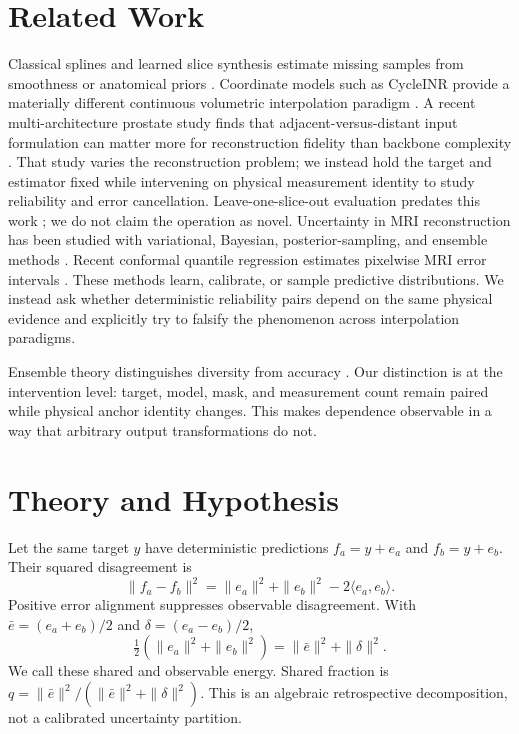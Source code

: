 \documentclass[journal,10pt]{IEEEtran}
\begin{document}
\section{Related Work}
Classical splines and learned slice synthesis estimate missing samples from smoothness or anatomical priors \cite{deboor1978splines,peng2020saint,song2024i3net}. Coordinate models such as CycleINR provide a materially different continuous volumetric interpolation paradigm \cite{fang2024cycleinr}. A recent multi-architecture prostate study finds that adjacent-versus-distant input formulation can matter more for reconstruction fidelity than backbone complexity \cite{savant2026formulation}. That study varies the reconstruction problem; we instead hold the target and estimator fixed while intervening on physical measurement identity to study reliability and error cancellation. Leave-one-slice-out evaluation predates this work \cite{horvath2017highorder}; we do not claim the operation as novel. Uncertainty in MRI reconstruction has been studied with variational, Bayesian, posterior-sampling, and ensemble methods \cite{edupuganti2021uncertainty,narnhofer2022bayesian,tanno2021uncertainty,kuestner2024ensembles}. Recent conformal quantile regression estimates pixelwise MRI error intervals \cite{giannakopoulos2026pixelwise}. These methods learn, calibrate, or sample predictive distributions. We instead ask whether deterministic reliability pairs depend on the same physical evidence and explicitly try to falsify the phenomenon across interpolation paradigms.

Ensemble theory distinguishes diversity from accuracy \cite{brown2005diversity,ortega2022diversity}. Our distinction is at the intervention level: target, model, mask, and measurement count remain paired while physical anchor identity changes. This makes dependence observable in a way that arbitrary output transformations do not.

\section{Theory and Hypothesis}
Let the same target $y$ have deterministic predictions $f_a=y+e_a$ and $f_b=y+e_b$. Their squared disagreement is
\begin{equation}
\|f_a-f_b\|^2=\|e_a\|^2+\|e_b\|^2-2\langle e_a,e_b\rangle.\label{eq:cov}
\end{equation}
Positive error alignment suppresses observable disagreement. With $\bar e=(e_a+e_b)/2$ and $\delta=(e_a-e_b)/2$,
\begin{equation}
\tfrac12(\|e_a\|^2+\|e_b\|^2)=\|\bar e\|^2+\|\delta\|^2.\label{eq:decomp}
\end{equation}
We call these shared and observable energy. Shared fraction is $q=\|\bar e\|^2/(\|\bar e\|^2+\|\delta\|^2)$. This is an algebraic retrospective decomposition, not a calibrated uncertainty partition.
\end{document}
